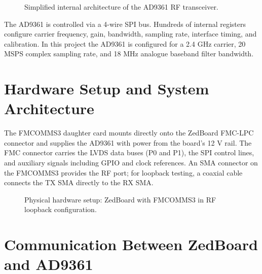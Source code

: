 \documentclass[12pt, a4paper, oneside]{report}
\begin{document}
\begin{figure}[H]
{%
  }
  \caption{Simplified internal architecture of the AD9361 RF transceiver.}
  \label{fig:ad9361_block}
\end{figure}

The AD9361 is controlled via a 4-wire SPI bus. Hundreds of internal registers configure carrier frequency, gain, bandwidth, sampling rate, interface timing, and calibration. In this project the AD9361 is configured for a 2.4 GHz carrier, 20 MSPS complex sampling rate, and 18 MHz analogue baseband filter bandwidth.

\section{Hardware Setup and System Architecture}

The FMCOMMS3 daughter card mounts directly onto the ZedBoard FMC-LPC connector and supplies the AD9361 with power from the board's 12 V rail. The FMC connector carries the LVDS data buses (P0 and P1), the SPI control lines, and auxiliary signals including GPIO and clock references. An SMA connector on the FMCOMMS3 provides the RF port; for loopback testing, a coaxial cable connects the TX SMA directly to the RX SMA.

\begin{figure}[H]
  \centering
  \caption{Physical hardware setup: ZedBoard with FMCOMMS3 in RF loopback configuration.}
  \label{fig:hw_setup}
\end{figure}

\section{Communication Between ZedBoard and AD9361}
\end{document}
